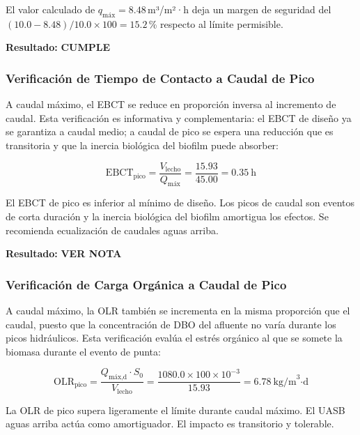 El valor calculado de $q_{\text{máx}} = 8.48$\,m³/m²·h deja un margen de seguridad del $(10.0 - 8.48) / 10.0 \times 100 = 15.2$\,\% respecto al límite permisible.

\textbf{Resultado:} \textbf{CUMPLE}

\subsubsection*{Verificación de Tiempo de Contacto a Caudal de Pico}

A caudal máximo, el EBCT se reduce en proporción inversa al incremento de caudal. Esta verificación es informativa y complementaria: el EBCT de diseño ya se garantiza a caudal medio; a caudal de pico se espera una reducción que es transitoria y que la inercia biológica del biofilm puede absorber:

\begin{equation}
\text{EBCT}_{\text{pico}} = \frac{V_{\text{lecho}}}{Q_{\text{máx}}} = \frac{15.93}{45.00} = 0.35\ \text{h}
\end{equation}

El EBCT de pico es inferior al mínimo de diseño. Los picos de caudal son eventos de corta duración y la inercia biológica del biofilm amortigua los efectos. Se recomienda ecualización de caudales aguas arriba.

\textbf{Resultado:} \textbf{VER NOTA}

\subsubsection*{Verificación de Carga Orgánica a Caudal de Pico}

A caudal máximo, la OLR también se incrementa en la misma proporción que el caudal, puesto que la concentración de DBO del afluente no varía durante los picos hidráulicos. Esta verificación evalúa el estrés orgánico al que se somete la biomasa durante el evento de punta:

\begin{equation}
\text{OLR}_{\text{pico}} = \frac{Q_{\text{máx,d}} \cdot S_0}{V_{\text{lecho}}} = \frac{1080.0 \times 100 \times 10^{-3}}{15.93} = 6.78\ \text{kg/m}^3\text{·d}
\end{equation}

La OLR de pico supera ligeramente el límite durante caudal máximo. El UASB aguas arriba actúa como amortiguador. El impacto es transitorio y tolerable.

